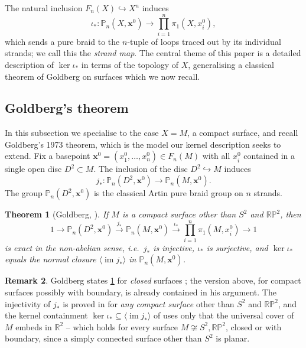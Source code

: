 \documentclass[reqno]{amsart}
\newtheorem{theorem}{Theorem}[section]
\theoremstyle{definition}
\newtheorem{remark}[theorem]{Remark}
\newcommand\bfx{\mathbf{x}}
\newcommand{\PB}{\mathbb{P}}
\newcommand{\im}{\operatorname{im}}
\newcommand{\R}{\mathbb{R}}
\newcommand{\RP}{\mathbb{RP}}
\newcommand{\co}[1]{\mathopen{\langle}#1\mathclose{\rangle}} %
\newcommand{\base}{\bfx^0}
\numberwithin{equation}{section}
\begin{document}
The natural inclusion \(F_n (X)\hookrightarrow X^n\) induces
\[
\iota_\ast \colon \PB_n(X,\base)\longrightarrow
\prod_{i=1}^n \pi_1(X, x_i^0),
\]
which sends a pure braid to the \(n\)-tuple of loops traced out by
its individual strands; we call this the \emph{strand map}. The
central theme of this paper is a detailed description of
\(\ker\iota_\ast\) in terms of the topology of \(X\), generalising a
classical theorem of Goldberg on surfaces which we now recall.

\subsection{Goldberg's theorem}

In this subsection we specialise to the case
\(X = M\), a compact surface, and recall Goldberg's 1973
\cite{Goldberg1973} theorem, which is the model our kernel
description seeks to extend. Fix a basepoint
\(\base = (x_1^0,\dots,x_n^0)\in F_n (M)\) with all
\(x_i^0\) contained in a single open disc \(D^2\subset M\). The
inclusion of the disc \(D^2\hookrightarrow M\) induces
\[
j_\ast \colon \PB_n(D^2,\base)\longrightarrow\PB_n(M,\base).
\]
The group \(\PB_n(D^2,\base)\) is the classical Artin pure braid group on
\(n\) strands.

\begin{theorem}[Goldberg, ]
\label{thm:goldberg}
If \(M\) is a compact surface other than \(S^2\) and \(\RP^2\), then
\[
1 \longrightarrow \PB_n(D^2,\base) \xrightarrow{j_\ast}
\PB_n(M,\base) \xrightarrow{\iota_\ast}
\prod_{i=1}^n \pi_1(M,x^0_i) \longrightarrow 1
\]
is exact in the non-abelian sense, i.e.\ \(j_\ast\) is injective,
\(\iota_\ast\) is surjective, and \(\ker \iota_\ast\) equals the normal
closure \(\co{\im j_\ast}\) in \(\PB_n(M,\base)\).
\end{theorem}

\begin{remark}\label{rem:goldberg-compact}
Goldberg states \cref{thm:goldberg} for \emph{closed}
surfaces \cite[Thm.~1]{Goldberg1973}; the version above, for
compact surfaces possibly with boundary, is already contained in
his argument. The injectivity of \(j_\ast\) is proved in
\cite[Lemma~3]{Goldberg1973} for \emph{any compact surface}
other than \(S^2\) and \(\RP^2\), and the kernel containment
\(\ker\iota_\ast\subseteq\co{\im j_\ast}\) of
\cite[Lemma~5]{Goldberg1973} uses only that the universal cover
of \(M\) embeds in \(\R^2\) -- which holds for every surface
\(M\not\cong S^2,\RP^2\), closed or with boundary, since a simply
connected surface other than \(S^2\) is planar.
\end{remark}
\end{document}
